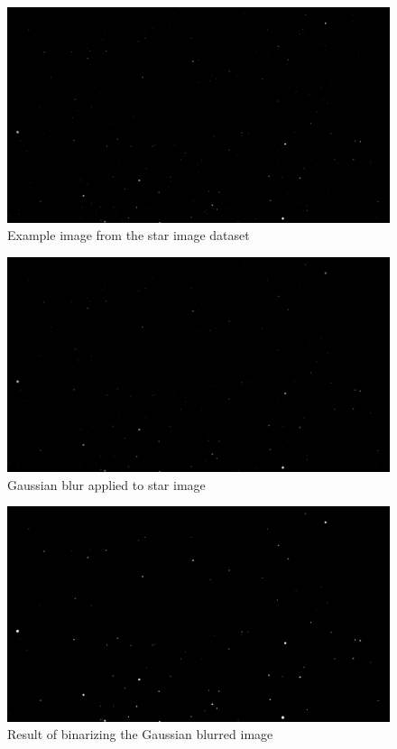 \documentclass[10pt,twocolumn,letterpaper]{article}
\begin{document}
\begin{figure}[h]
  \centering
   \includegraphics[width=0.9\linewidth]{stars_000}
   \caption{Example image from the star image dataset}
   \label{fig:star_img}
\end{figure}

\begin{figure}[h]
  \centering
   \includegraphics[width=0.9\linewidth]{gauss}
   \caption{Gaussian blur applied to star image}
   \label{fig:star_gauss}
\end{figure}

\begin{figure}[h]
  \centering
   \includegraphics[width=0.9\linewidth]{binary}
   \caption{Result of binarizing the Gaussian blurred image}
   \label{fig:star_binary}
\end{figure}
\end{document}
